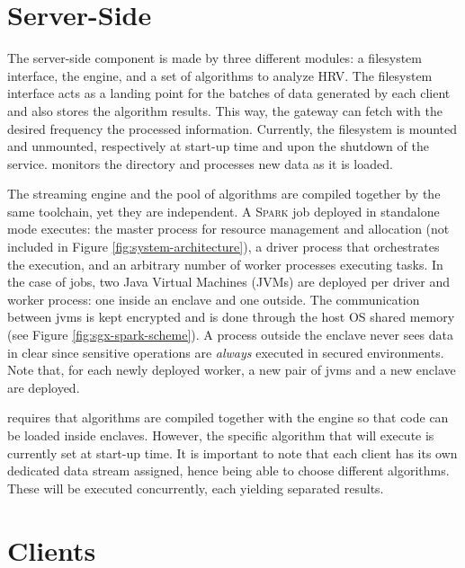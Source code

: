 \section{Server-Side} \label{sec:server}

The server-side component is made by three different modules: a filesystem interface, the \sgxspark engine, and a set of algorithms to analyze HRV. 
The filesystem interface acts as a landing point for the batches of data generated by each client and also stores the algorithm results.
This way, the gateway can fetch with the desired frequency the processed information.
Currently, the filesystem is mounted and unmounted, respectively at start-up time and upon the shutdown of the service. 
\sgxspark monitors the directory and processes new data as it is loaded.

The streaming engine and the pool of algorithms are compiled together by the same toolchain, yet they are independent. 
A \textsc{Spark} job deployed in standalone mode executes: the master process for resource management and allocation (not included in Figure \ref{fig:system-architecture}), a driver process that orchestrates the execution, and an arbitrary number of worker processes executing tasks.
In the case of \sgxspark jobs, two Java Virtual Machines (JVMs) are deployed per driver and worker process: one inside an enclave and one outside.
The communication between \acrshort{jvm}s is kept encrypted and is done through the host OS shared memory (see Figure \ref{fig:sgx-spark-scheme}).
A process outside the enclave never sees data in clear since sensitive operations are \emph{always} executed in secured environments.
Note that, for each newly deployed worker, a new pair of \acrshort{jvm}s and a new enclave are deployed.

\sgxspark requires that algorithms are compiled together with the engine so that code can be loaded inside enclaves.
However, the specific algorithm that \projName will execute is currently set at start-up time.
It is important to note that each client has its own dedicated data stream assigned, hence being able to choose different algorithms.
These will be executed concurrently, each yielding separated results. 

\section{Clients} \label{sec:clients}


